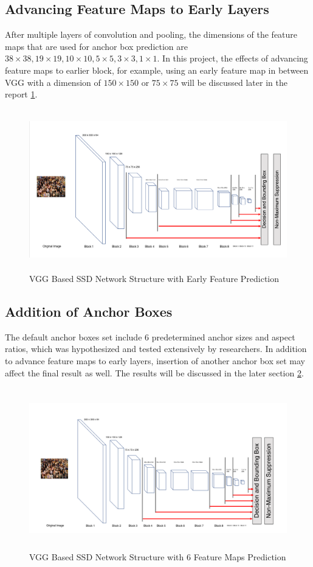 \documentclass{article}
\begin{document}
\subsection{Advancing Feature Maps to Early Layers}

After multiple layers of convolution and pooling, the dimensions of the feature maps that are used for anchor box prediction are $38 \times 38, 19 \times 19, 10 \times 10, 5 \times 5, 3 \times 3, 1 \times 1 $. In this project, the effects of advancing feature maps to earlier block, for example, using an early feature map in between VGG with a dimension of $150 \times 150$ or $75 \times 75$ will be discussed later in the report \ref{F2}.

\begin{figure}
	\centering
	\includegraphics[height=7cm]{VGGSSDAdvance.png}
	\caption{VGG Based SSD Network Structure with Early Feature Prediction}	
	\label{F2}
	\end{figure}


\subsection{Addition of Anchor Boxes}

The default anchor boxes set include 6 predetermined anchor sizes and aspect ratios, which was hypothesized and tested extensively by researchers. In addition to advance feature maps to early layers, insertion of another anchor box set may affect the final result as well. The results will be discussed in the later section \ref{F3}.

\begin{figure}
	\centering
	\includegraphics[height=7cm]{VGGSSD6Layer.png}
	\caption{VGG Based SSD Network Structure with 6 Feature Maps Prediction}	
	\label{F3}
	\end{figure}
\end{document}

